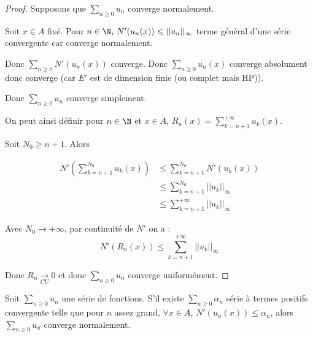 
\begin{proof}
    Supposons que $\displaystyle \sum_{n \geqslant 0} u_n$ converge normalement.

    Soit $x \in A$ fixé. Pour $n \in \N, \, N'(u_n(x)) \leqslant || u_n ||_{\infty}$ terme général 
    d'une série convergente car converge normalement. 

    Donc $\sum_{n \geqslant 0} N'(u_n(x))$ converge. Donc $\sum_{n \geqslant 0} u_n(x)$
    converge absolument donc converge (car $E'$ est de dimension finie (ou complet mais HP)). 

    Donc $\displaystyle \sum_{n \geqslant 0} u_n$ converge simplement.

    On peut ainsi définir pour $n \in \N$ et $x \in A$, $\displaystyle R_n(x) = \sum_{k = n + 1}^{ + \infty } u_k(x)$.


    Soit $N_0 \geqslant n + 1$. Alors 

    \begin{align}
        N'\left( \sum_{k = n + 1}^{N_0} u_k(x) \right) & \leqslant \sum_{k = n + 1}^{N_0} N'(u_k(x)) \\
        & \leqslant \sum_{k = n + 1}^{N_0} || u_k ||_{\infty} \\
        & \leqslant \sum_{k = n + 1}^{ + \infty } || u_k ||_{\infty}
    \end{align}

    Avec $N_0 \to + \infty$, par continuité de $N'$ on a : 
    \[
        N'(R_n(x)) \leqslant \sum_{k = n + 1}^{ + \infty } || u_k ||_{\infty}
    \]

    Donc $\displaystyle R_n \xrightarrow[CU]{} 0$ et donc $\displaystyle \sum_{n \geqslant 0} u_n$ converge uniformément.
\end{proof}

\begin{proposition}{}{}
    Soit $\sum_{n \geqslant 0} u_n$ une série de fonctions. S'il existe
    $\sum_{n \geqslant 0} \alpha_n$ série à termes positifs convergente telle que 
    pour $n$ assez grand, $\forall x \in A, \, N'(u_n(x)) \leqslant \alpha_n$, alors 
    $\sum_{n \geqslant 0} u_n$ converge normalement.
\end{proposition}



